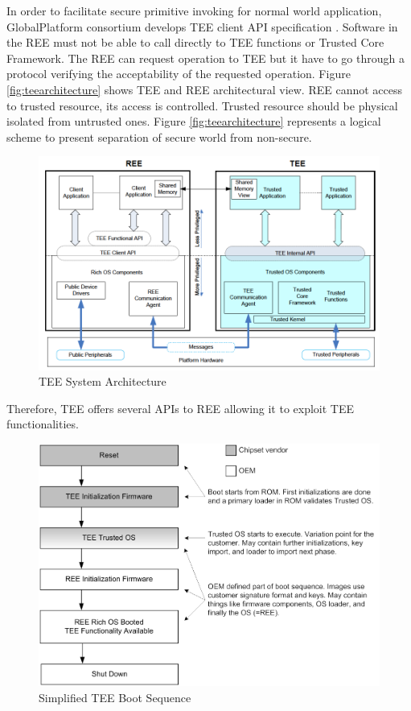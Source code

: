 \documentclass[../tesi.tex]{subfiles}
\begin{document}
In order to facilitate secure primitive invoking for normal world application, GlobalPlatform consortium develops TEE client API specification \cite{globalplatform2010TEE}.
Software in the REE must not be able to call directly to TEE functions or Trusted Core Framework. The REE can request operation to TEE but it have to go through a protocol verifying the acceptability of the requested operation. Figure \ref{fig:teearchitecture} shows TEE and REE architectural view. REE cannot access to trusted resource, its access is controlled. Trusted resource should be physical isolated from untrusted ones. Figure  \ref{fig:teearchitecture} represents a logical scheme to present separation of secure world from non-secure. 
\begin{figure}
\centering
\includegraphics[scale=0.35]{images/teesoftware.png}
\caption{TEE System Architecture}
\label{fig:teesoftware}
\end{figure}
Therefore, TEE offers several APIs to REE allowing it to exploit TEE functionalities. \\
\begin{figure}
\centering
\includegraphics[scale=0.25]{images/teeboot.png}
\caption{Simplified TEE Boot Sequence}
\label{fig:teeboot}
\end{figure}
\end{document}
